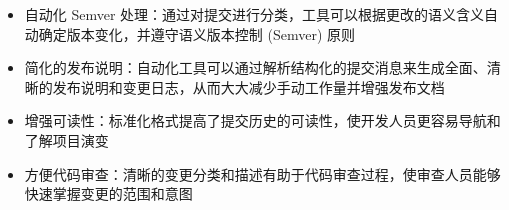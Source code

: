 \begin{itemize}
\item
自动化 Semver 处理：通过对提交进行分类，工具可以根据更改的语义含义自动确定版本变化，并遵守语义版本控制 (Semver) 原则

\item
简化的发布说明：自动化工具可以通过解析结构化的提交消息来生成全面、清晰的发布说明和变更日志，从而大大减少手动工作量并增强发布文档

\item
增强可读性：标准化格式提高了提交历史的可读性，使开发人员更容易导航和了解项目演变

\item
方便代码审查：清晰的变更分类和描述有助于代码审查过程，使审查人员能够快速掌握变更的范围和意图
\end{itemize}















































